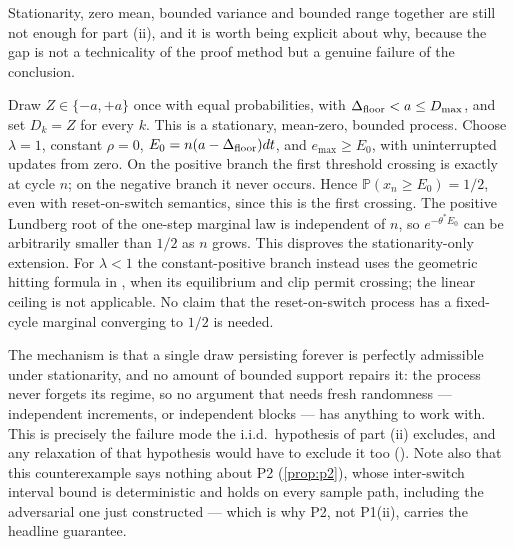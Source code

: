 \begin{remark} \label{rem:dep}
Stationarity, zero mean, bounded variance and bounded range together are still not enough for part (ii), and it is worth being explicit about why, because the gap is not a technicality of the proof method but a genuine failure of the conclusion.

Draw $Z\in\{-a,+a\}$ once with equal probabilities, with $\Delta_{\text{floor}}<a\le D_{\max}$, and set $D_k=Z$ for every $k$. This is a stationary, mean-zero, bounded process. Choose $\lambda=1$, constant $\rho=0$, $E_0=n(a-\Delta_{\text{floor}})dt$, and $e_{\max}\ge E_0$, with uninterrupted updates from zero. On the positive branch the first threshold crossing is exactly at cycle $n$; on the negative branch it never occurs. Hence $\mathbb{P}(x_n\ge E_0)=1/2$, even with reset-on-switch semantics, since this is the first crossing. The positive Lundberg root of the one-step marginal law is independent of $n$, so $e^{-\theta^*E_0}$ can be arbitrarily smaller than $1/2$ as $n$ grows. This disproves the stationarity-only extension. For $\lambda<1$ the constant-positive branch instead uses the geometric hitting formula in , when its equilibrium and clip permit crossing; the linear ceiling is not applicable. No claim that the reset-on-switch process has a fixed-cycle marginal converging to $1/2$ is needed.

The mechanism is that a single draw persisting forever is perfectly admissible under stationarity, and no amount of bounded support repairs it: the process never forgets its regime, so no argument that needs fresh randomness --- independent increments, or independent blocks --- has anything to work with. This is precisely the failure mode the i.i.d.\ hypothesis of part (ii) excludes, and any relaxation of that hypothesis would have to exclude it too (). Note also that this counterexample says nothing about P2 (\cref{prop:p2}), whose inter-switch interval bound is deterministic and holds on every sample path, including the adversarial one just constructed --- which is why P2, not P1(ii), carries the headline guarantee.
\end{remark}

